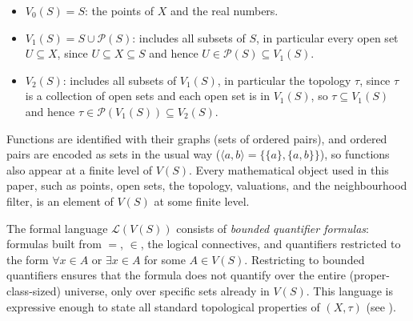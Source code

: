 \documentclass[submission,copyright,creativecommons]{eptcs}
\begin{document}
\begin{itemize}
  \item $V_0(S) = S$: the points of $X$ and the real numbers.
  \item $V_1(S) = S \cup \mathcal{P}(S)$: includes all subsets of $S$,
    in particular every open set $U \subseteq X$, since $U \subseteq X
    \subseteq S$ and hence $U \in \mathcal{P}(S) \subseteq V_1(S)$.
  \item $V_2(S)$: includes all subsets of $V_1(S)$, in particular the topology $\tau$, since $\tau$ is a collection of open sets and each open set is in $V_1(S)$, so $\tau \subseteq V_1(S)$ and hence $\tau \in \mathcal{P}(V_1(S)) \subseteq V_2(S)$.
\end{itemize}

Functions are identified with their graphs (sets of ordered pairs), and ordered pairs are encoded as sets in the usual way ($\langle a,b\rangle = \{\{a\},\{a,b\}\}$), so functions also appear at a finite level of $V(S)$.
Every mathematical object used in this paper, such as points, open sets, the topology, valuations, and the neighbourhood filter, is an element of $V(S)$ at some finite level.

The formal language $\mathcal{L}(V(S))$ consists of \emph{bounded quantifier formulas}: formulas built from $=$, $\in$, the logical connectives, and quantifiers restricted to the form $\forall x \in A$ or $\exists x \in A$ for some $A \in V(S)$.
Restricting to bounded quantifiers ensures that the formula does not quantify over the entire (proper-class-sized) universe, only over specific sets already in $V(S)$. 
This language is expressive enough to state all standard topological properties of $(X,\tau)$
(see \cite{SalbanyTodorov1999}).
\end{document}
